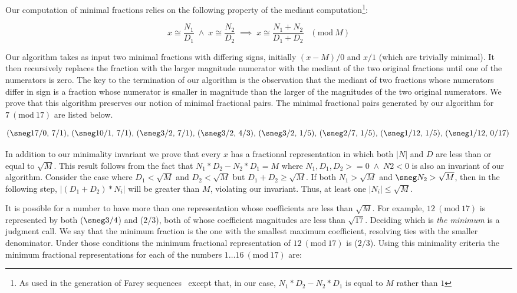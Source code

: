 \documentclass[submission,copyright,creativecommons]{eptcs}
\newcommand{\Mod}[1]{\ (\mathrm{mod}\ #1)}
\begin{document}
Our computation of minimal fractions relies on the following property
of the mediant computation\footnote{As used in the generation of Farey
  sequences~\cite{Farey} except that, in our case, $N_1*D_2 - N_2*D_1$
  is equal to $M$ rather than $1$}:

\begin{equation*}
x \cong \frac{N_1}{D_1} \; \land \;
x \cong \frac{N_2}{D_2} \; \implies \;
x \cong \frac{N_1 + N_2}{D_1 + D_2} \; \; \Mod{M}
\end{equation*}

Our algorithm takes as input two minimal fractions with differing
signs, initially $(x-M)/0$ and $x/1$ (which are trivially minimal).  It
then recursively replaces the fraction with the larger magnitude
numerator with the mediant of the two original fractions until one of
the numerators is zero.  The key to the termination of our algorithm
is the observation that the mediant of two fractions whose numerators
differ in sign is a fraction whose numerator is smaller in magnitude
than the larger of the magnitudes of the two original numerators.  We
prove that this algorithm preserves our notion of minimal fractional pairs.
The minimal fractional pairs generated by our algorithm
for $7 \Mod{17}$ are listed below.

{\small
\[
(\sneg17/0,\,7/1),\,
(\sneg10/1,\,7/1),\,(\sneg3/2,\,7/1),\,(\sneg3/2,\,4/3),\,(\sneg3/2,\,1/5),\,(\sneg2/7,\,1/5),\,(\sneg1/12,\,1/5),\,
(\sneg1/12,\,0/17)\,
\]
}

\begin{spacing}{1.05}
In addition to our minimality invariant we prove that every $x$ has a
fractional representation in which both $\lvert N \rvert$ and $D$ are
less than or equal to $\sqrt{M}$.  This result follows from the fact
that $N_1*D_2 - N_2*D_1 = M$ where $N_1,D_1,D_2 >= 0 \;\land \;N2 < 0$ is
also an invariant of our algorithm.  Consider the case
where $D_1 < \sqrt{M}$ and $D_2 < \sqrt{M}$ but $D_1 + D_2 \geq \sqrt{M}$.
If both $N_1 > \sqrt{M}$ and $\sneg N_2 > \sqrt{M}$,
then in the following step, $\lvert (D_1 + D_2)*N_i \rvert$ will be
greater than $M$, violating our invariant.  Thus, at
least one $\lvert N_i \rvert \leq \sqrt{M}$.
\end{spacing}

It is possible for a number to have more than one representation whose
coefficients are less than $\sqrt{M}$.  For example, $12 \Mod{17}$ is
represented by both ($\sneg3/4$) and ($2/3$), both of whose
coefficient magnitudes are less than $\sqrt{17}$.  Deciding which is
\emph{the minimum} is a judgment call.  We say that the minimum
fraction is the one with the smallest maximum coefficient, resolving
ties with the smaller denominator.  Under those conditions the
minimum fractional representation of $12 \Mod{17}$ is ($2/3$).  Using
this minimality criteria the minimum fractional representations for
each of the numbers $1\dots16 \Mod{17}$ are:
\end{document}
